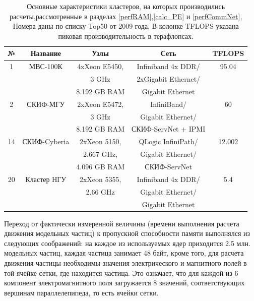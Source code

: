 \begin{table}[ht]
\caption{
Основные характеристики кластеров, на которых производились расчеты,рассмотренные в разделах \ref{perfRAM},\ref{calc_PE} и \ref{perfCommNet}, Номера даны по списку Top50 от 2009 года, В колонке TFLOPS указана пиковая производительность в терафлопсах.}
	\begin{center}
		\begin{tabular}{|c|c|c|c|c|}
			\hline
			№                 & Название & Узлы               & Сеть                                   &  TFLOPS\\
		          \hline 
			1                & МВС-100К & 4xXeon E5450,      &  Infiniband 4x DDR/                    & 95.04 \\
			&          & 3 GHz              &  2xGigabit Ethernet/                   &       \\
			&          & 8.192 GB RAM       &  Gigabit Ethernet                      &    \\ \hline 
			2                 & СКИФ-МГУ & 2xXeon E5472,      & InfiniBand/                             & 60   \\
			&          &   3 GHz            & Gigabit Ethernet/                       &      \\
			&          &  8.192 GB RAM      & СКИФ-ServNet + IPMI                    &   \\ \hline 
			14                & СКИФ-Cyberia & 2xXeon 5150,   &  QLogic InfiniPath/                     & 12.002 \\
			&              &  2.667 GHz,    & Gigabit Ethernet/                       &   \\
			&           &     4.096 GB RAM  & СКИФ-ServNet                            & \\ \hline 
			20                & Кластер НГУ & 2xXeon 5355,    &  Infiniband 4x DDR/                    & 5.4 \\ 
			&           & 2.66 GHz          &   Gigabit Ethernet/                    &  \\
			&           &                   &   Gigabit Ethernet                     &  \\ \hline 
			
		\end{tabular}
	\end{center}

	\label{top50_2010}
\end{table}

Переход от фактически измеренной величины (времени выполнения расчета движения модельных частиц) к пропускной способности памяти выполнялся из следующих соображений: на каждое из используемых ядер приходится 2.5 млн. модельных частиц, каждая частица занимает 48 байт, кроме того, для расчета движения частицы необходимы значения электрического и магнитного полей в той ячейке сетки, где находится частица. Это означает, что для каждой из 6 компонент электромагнитного поля загружается 8 значений, соответствующих вершинам параллелепипеда, то есть ячейки сетки. 

